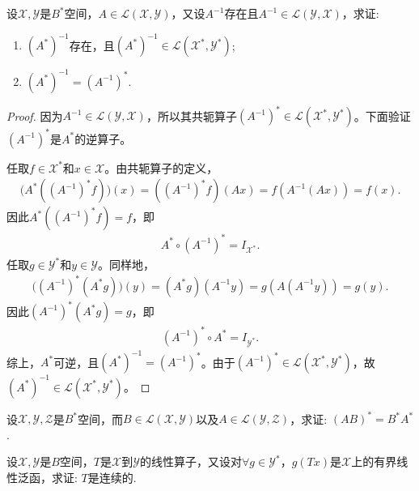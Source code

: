 \documentclass[../../main.tex]{subfiles}%
\begin{document}
\begin{example}
设$\mathscr{X},\mathscr{Y}$是$B^*$空间，$A\in\mathscr{L}(\mathscr{X},\mathscr{Y})$，又设$A^{-1}$存在且$A^{-1}\in\mathscr{L}(\mathscr{Y},\mathscr{X})$，求证:
\begin{enumerate}[(1)]
\item $(A^*)^{-1}$存在，且$(A^*)^{-1}\in\mathscr{L}(\mathscr{X}^*,\mathscr{Y}^*)$;
\item $(A^*)^{-1}=(A^{-1})^*$.
\end{enumerate}
\end{example}
\begin{proof}

因为$A^{-1}\in\mathscr{L}(\mathscr{Y},\mathscr{X})$，所以其共轭算子$(A^{-1})^*\in\mathscr{L}(\mathscr{X}^*,\mathscr{Y}^*)$。下面验证$(A^{-1})^*$是$A^*$的逆算子。

任取$f\in\mathscr{X}^*$和$x\in\mathscr{X}$。由共轭算子的定义，
\begin{align*}
\bigl(A^*((A^{-1})^*f)\bigr)(x)
=((A^{-1})^*f)(Ax)
=f(A^{-1}(Ax))
=f(x).
\end{align*}
因此$A^*((A^{-1})^*f)=f$，即
\begin{align*}
A^*\circ(A^{-1})^*=I_{\mathscr{X}^*}.
\end{align*}
任取$g\in\mathscr{Y}^*$和$y\in\mathscr{Y}$。同样地，
\begin{align*}
\bigl((A^{-1})^*(A^*g)\bigr)(y)
=(A^*g)(A^{-1}y)
=g(A(A^{-1}y))
=g(y).
\end{align*}
因此$(A^{-1})^*(A^*g)=g$，即
\begin{align*}
(A^{-1})^*\circ A^*=I_{\mathscr{Y}^*}.
\end{align*}
综上，$A^*$可逆，且$(A^*)^{-1}=(A^{-1})^*$。由于$(A^{-1})^*\in\mathscr{L}(\mathscr{X}^*,\mathscr{Y}^*)$，故$(A^*)^{-1}\in\mathscr{L}(\mathscr{X}^*,\mathscr{Y}^*)$。
\end{proof}

\begin{example}
设$\mathscr{X},\mathscr{Y},\mathscr{Z}$是$B^*$空间，而$B\in\mathscr{L}(\mathscr{X},\mathscr{Y})$以及$A\in\mathscr{L}(\mathscr{Y},\mathscr{Z})$，求证: $(AB)^*=B^*A^*$.
\end{example}

\begin{example}
设$\mathscr{X},\mathscr{Y}$是$B$空间，$T$是$\mathscr{X}$到$\mathscr{Y}$的线性算子，又设对$\forall g\in\mathscr{Y}^*$，$g(Tx)$是$\mathscr{X}$上的有界线性泛函，求证: $T$是连续的.
\end{example}
\end{document}

